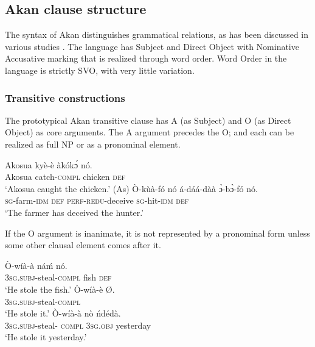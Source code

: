 \documentclass[output=paper]{langsci/langscibook}
\begin{document}
\subsection{Akan clause structure}\label{§2.3:akan.osam}

The syntax of Akan distinguishes grammatical relations, as has been discussed in various studies \citep{osam1994a,osam1996,osam1997,osam2000,osam2004}. The language has Subject and Direct Object with Nominative Accusative marking that is realized through word order. Word Order in the language is strictly SVO, with very little variation.

\subsubsection{Transitive constructions}\label{§2.3.1:transitive.osam}

The prototypical Akan transitive clause has A (as Subject) and O (as Direct Object) as core arguments. The A argument precedes the O; and each can be realized as full NP or as a pronominal element.

\ea\label{ex:14.osam}
\ea\label{ex:14a.osam}
\gll  Akosua    kyè-è    àkókɔ́    nó.\\
       Akosua  catch-\textsc{compl}  chicken  \textsc{def}\\
\glt   `Akosua caught the chicken.' (As)
\ex\label{ex:14b.osam}
\gll    Ò-kùà-fó    nó  á-dáá-dàà    ɔ̀-bɔ̀-fó    nó.\\
       \textsc{sg}-farm-\textsc{idm}    \textsc{def}  \textsc{perf-redu}-deceive  \textsc{sg}-hit-\textsc{idm}  \textsc{def}\\
\glt   `The farmer has deceived the hunter.'
\z 
\z 

If the O argument is inanimate, it is not represented by a pronominal form unless some other clausal element comes after it.

\ea\label{ex:15.osam}
\ea\label{ex:15a.osam}
\gll   Ò-wíà-à    náḿ  nó.\\
       \textsc{3sg.subj}-steal-\textsc{compl}  fish  \textsc{def}\\
\glt   `He stole the fish.'
\ex\label{ex:15b.osam}
\gll   Ò-wíà-è      Ø.\\
       \textsc{3sg.subj}-steal-\textsc{compl}\\
\glt   `He stole it.'
\ex\label{ex:15c.osam}
\gll   Ò-wíà-à      nò    ńdédà.\\
       \textsc{3sg.subj}-steal-\textsc{ compl}  \textsc{3sg.obj}  yesterday\\
\glt   `He stole it yesterday.'
\z 
\z 
\end{document}

